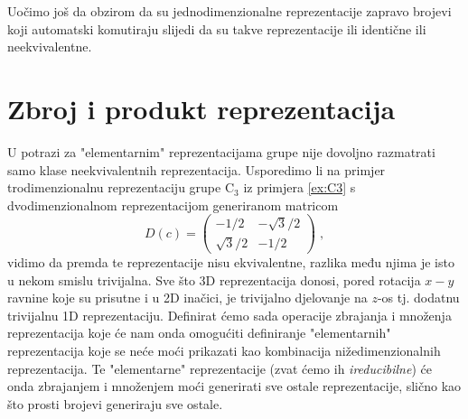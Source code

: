 Uočimo još da obzirom da su jednodimenzionalne reprezentacije zapravo brojevi koji
automatski komutiraju slijedi da su takve reprezentacije ili identične ili
neekvivalentne.


\section{Zbroj i produkt reprezentacija}

U potrazi za "elementarnim" reprezentacijama grupe nije dovoljno razmatrati samo
klase neekvivalentnih reprezentacija. Usporedimo li na primjer
trodimenzionalnu reprezentaciju 
grupe $\mathrm{C}_3$ iz primjera \ref{ex:C3} s dvodimenzionalnom reprezentacijom
generiranom matricom
\begin{equation}
  D(c) = 
\begin{pmatrix}
-1/2 & -\sqrt{3}/2  \\
\sqrt{3}/2 & -1/2 
\end{pmatrix} \;,
    \label{eq:c3rep2D}
\end{equation}
vidimo da premda te reprezentacije nisu ekvivalentne, razlika
među njima je isto u nekom smislu trivijalna.
Sve što 3D reprezentacija
donosi, pored rotacija $x-y$ ravnine koje su prisutne i u 2D inačici,
je trivijalno djelovanje na $z$-os tj. dodatnu trivijalnu 1D reprezentaciju.
Definirat ćemo sada operacije zbrajanja i množenja reprezentacija koje
će nam onda omogućiti definiranje "elementarnih" reprezentacija koje se
neće moći prikazati kao kombinacija nižedimenzionalnih reprezentacija.
Te "elementarne" reprezentacije (zvat ćemo ih \emph{ireducibilne}) će onda
zbrajanjem i množenjem moći generirati sve ostale reprezentacije,
slično kao što prosti brojevi generiraju sve ostale.

